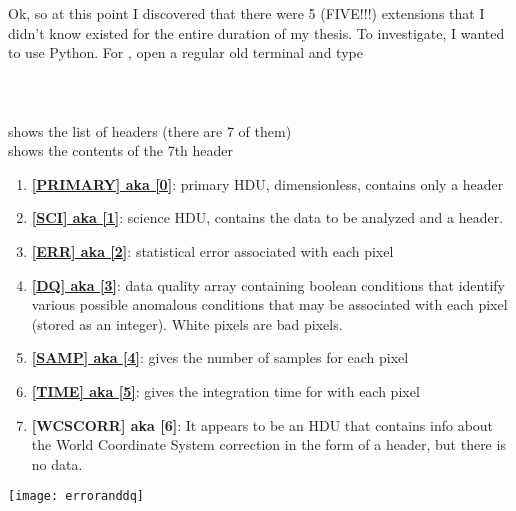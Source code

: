 \documentclass[11pt,obeyspaces]{article} %
\begin{document}
\newpage
\begin{oframed}
Ok, so at this point I discovered that there were 5 (FIVE!!!) extensions that I didn't know existed for the entire duration of my thesis. To investigate, I wanted to use Python. For , open a regular old terminal and type \\
 \\
\\
\\
 shows the list of headers (there are 7 of them) \\ 
 shows the contents of the 7th header
\begin{enumerate}
\item \href{http://fits.gsfc.nasa.gov/fits_primer.html}{\bf [PRIMARY] aka [0]}: primary HDU, dimensionless, contains only a header 
\item \href{http://fits.gsfc.nasa.gov/fits_primer.html}{\bf [SCI] aka [1]}: science HDU, contains the data to be analyzed and a header.
\item \href{http://iraf.noao.edu/irafnews/apr98/irafnews.8.html}{\bf [ERR] aka [2]}: statistical error associated with each pixel 
\item \href{http://iraf.noao.edu/irafnews/apr98/irafnews.8.html}{\bf [DQ] aka [3]}: data quality array containing boolean conditions that identify various possible anomalous conditions that may be associated with each pixel (stored as an integer). White pixels are bad pixels. 
\item \href{http://iraf.noao.edu/irafnews/apr98/irafnews.8.html}{\bf [SAMP] aka [4]}: gives the number of samples for each pixel
\item \href{http://iraf.noao.edu/irafnews/apr98/irafnews.8.html}{\bf [TIME] aka [5]}: gives the integration time for with each pixel
\item \textbf{[WCSCORR] aka [6]}: It appears to be an HDU that contains info about the World Coordinate System correction in the form of a header, but there is no data.
\end{enumerate}
\begin{center}
\texttt{[image: erroranddq]}
\label{fig:errdq}
\end{center}
\end{oframed}
\end{document}
